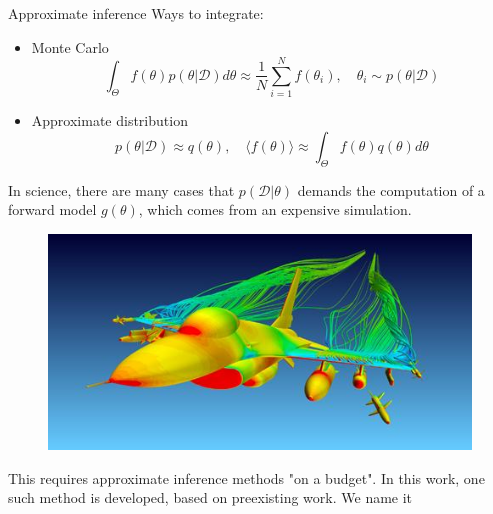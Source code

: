 \documentclass{beamer}
\begin{document}
\begin{frame}{}
\begin{block}{Approximate inference}
Ways to integrate:
\begin{itemize}
\item Monte Carlo
\begin{equation*}
\int_\Theta f(\theta) p(\theta|\mathcal{D}) d\theta \approx \frac{1}{N} \sum_{i=1}^N f(\theta_i), \quad \theta_i \sim p(\theta|\mathcal{D})
\end{equation*}
\item Approximate distribution
\begin{equation*}
p(\theta|\mathcal{D}) \approx q(\theta), \quad \langle f(\theta) \rangle \approx \int_\Theta f(\theta) q(\theta) d\theta
\end{equation*}
\end{itemize}

\begin{block}{}
\end{block}

\end{block}
\end{frame}

\begin{frame}
\begin{block}{}
In science, there are many cases that $p(\mathcal{D}|\theta)$ demands the computation of a forward model $g(\theta)$, which comes from an expensive simulation.
\begin{figure}[h]
\centering
\includegraphics[height=0.3\paperheight]{figs/simulation_figure.jpg}
\end{figure}
This requires approximate inference methods "on a budget". In this work, one such method is developed, based on preexisting work. We name it
\begin{block}{}
\end{block}
\end{block}
\end{frame}
\end{document}
